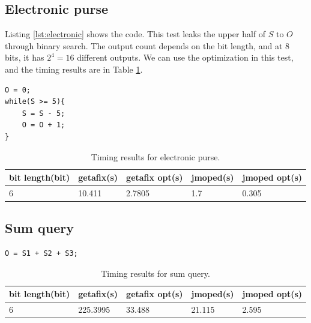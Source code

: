 \subsection{Electronic purse}
Listing \ref{lst:electronic} shows the code. This test leaks the upper half of $S$ to $O$ through binary search. The output count depends on the bit length, and at $8$ bits, it has $2^{4} = 16$ different outputs. We can use the optimization in this test, and the timing results are in Table \ref{tbl:electronic}.

\lstset{language=C}  
\begin{lstlisting}[caption={Electronic purse test program.},label=lst:electronic]
O = 0;
while(S >= 5){
	S = S - 5;
	O = O + 1;
}
\end{lstlisting}

\begin{table}[htbp]
\begin{tabular}{|l|l|l|l|l|}
\hline
{bit length(bit)} & getafix(s) & {getafix opt(s)} & jmoped(s) & {jmoped opt(s)} \\ \hline
{6} & {10.411} & {2.7805} & {1.7} & {0.305} \\ \hline
\end{tabular}
\caption{Timing results for electronic purse.}
\label{tbl:electronic}
\end{table}

\subsection{Sum query}

\lstset{language=C}  
\begin{lstlisting}[caption={Sum query test program.},label=lst:sum]
O = S1 + S2 + S3;
\end{lstlisting}

\begin{table}[htbp]
\begin{tabular}{|l|l|l|l|l|}
\hline
{bit length(bit)} & getafix(s) & {getafix opt(s)} & jmoped(s) & {jmoped opt(s)} \\ \hline
6 & 225.3995 & 33.488 & 21.115 & 2.595	\\ \hline
\end{tabular}
\caption{Timing results for sum query.}
\label{tbl:sum}
\end{table}
